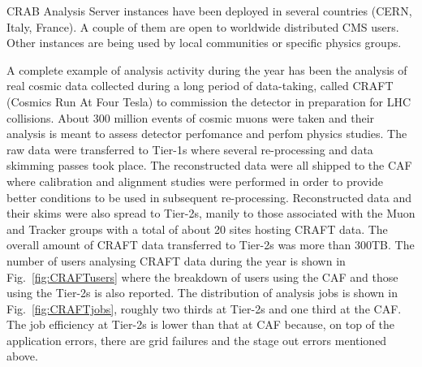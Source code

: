 CRAB Analysis Server instances have been deployed in several countries (CERN, Italy, France). A couple of them are open to worldwide distributed CMS users. Other instances are being used by local communities or specific physics groups.

A complete example of analysis activity during the year has been the analysis 
of real cosmic data collected during a long period of data-taking, called CRAFT (Cosmics Run At Four Tesla) to commission the detector in preparation for LHC collisions. About 300 million events of cosmic muons were taken and their analysis is meant to assess detector perfomance and perfom physics studies.
The raw data were transferred to Tier-1s where several re-processing and data skimming passes took place. The reconstructed data were all shipped to the CAF where calibration and alignment studies were performed in order to provide better conditions to be used in subsequent re-processing. 
Reconstructed data and their skims were also spread to Tier-2s, manily to 
those associated with the Muon and Tracker groups with a total of about 20 sites hosting CRAFT data. The overall amount of CRAFT data transferred to Tier-2s was more than 300TB.
The number of users analysing CRAFT data during the year is shown in Fig.~\ref{fig:CRAFTusers} where the breakdown of users using the CAF and those using the Tier-2s is also reported. The distribution of analysis jobs is shown in Fig.~\ref{fig:CRAFTjobs}, roughly two thirds at Tier-2s and one third at the CAF.
The job efficiency at Tier-2s is lower than that at CAF because, on top of the application errors, there are grid failures and the stage out errors mentioned above.

